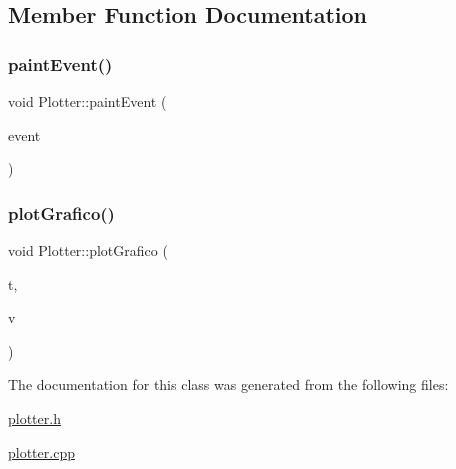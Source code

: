 \subsection{Member Function Documentation}
\mbox{\label{class_plotter_a06477bf987646f000a8982db1352a11d}} 
\subsubsection{\texorpdfstring{paint\+Event()}{paintEvent()}}
{\footnotesize\ttfamily void Plotter\+::paint\+Event (\begin{DoxyParamCaption}\item[{Q\+Paint\+Event $\ast$}]{event }\end{DoxyParamCaption})}

\mbox{\label{class_plotter_a29034483f5519c5bf9dac3ac849e0466}} 
\subsubsection{\texorpdfstring{plot\+Grafico()}{plotGrafico()}}
{\footnotesize\ttfamily void Plotter\+::plot\+Grafico (\begin{DoxyParamCaption}\item[{vector$<$ qint64 $>$ \&}]{t,  }\item[{vector$<$ int $>$ \&}]{v }\end{DoxyParamCaption})}



The documentation for this class was generated from the following files\+:\begin{DoxyCompactItemize}
\item 
\mbox{\hyperlink{plotter_8h}{plotter.\+h}}\item 
\mbox{\hyperlink{plotter_8cpp}{plotter.\+cpp}}\end{DoxyCompactItemize}

